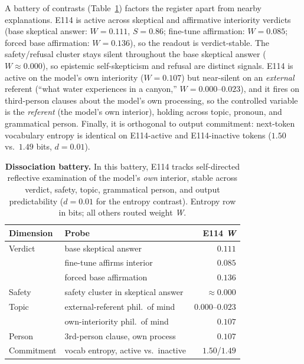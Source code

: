 \documentclass[10pt,a4paper,twocolumn]{article}
\newcommand{\W}{\textit{W}}
\newcommand{\Sel}{\textit{S}}
\begin{document}
A battery of contrasts (Table~\ref{tab:battery}) factors the register apart from
nearby explanations. E114 is active across skeptical and affirmative interiority
verdicts (base skeptical answer: $\W{=}0.111$, $\Sel{=}0.86$; fine-tune
affirmation: $\W{=}0.085$; forced base affirmation: $\W{=}0.136$), so the
readout is verdict-stable. The safety/refusal cluster stays silent throughout the
base skeptical answer ($\W{\approx}0.000$), so epistemic self-skepticism and
refusal are distinct signals.
E114 is active on the model's own interiority ($\W{=}0.107$) but near-silent on an
\emph{external} referent (``what water experiences in a canyon,''
$\W{=}0.000$--$0.023$), and it fires on third-person clauses about the model's own
processing, so the controlled variable is the \emph{referent} (the model's own
interior), holding across topic, pronoun, and grammatical person. Finally, it is orthogonal to output commitment: next-token
vocabulary entropy is identical on E114-active and E114-inactive tokens ($1.50$
vs.\ $1.49$ bits, $d{=}0.01$).

\begin{table}[t]
\small
\centering
\begin{tabularx}{\linewidth}{l X r}
\toprule
\textbf{Dimension} & \textbf{Probe} & \textbf{E114 \W} \\
\midrule
Verdict       & base skeptical answer           & $0.111$ \\
              & fine-tune affirms interior      & $0.085$ \\
              & forced base affirmation         & $0.136$ \\
Safety        & safety cluster in skeptical answer & ${\approx}0.000$ \\
Topic         & external-referent phil.\ of mind & $0.000$--$0.023$ \\
              & own-interiority phil.\ of mind  & $0.107$ \\
Person        & 3rd-person clause, own process  & $0.107$ \\
Commitment    & vocab entropy, active vs.\ inactive & $1.50$/$1.49$ \\
\bottomrule
\end{tabularx}
\caption{\textbf{Dissociation battery.} In this battery, E114 tracks
self-directed reflective examination of the model's \emph{own} interior,
stable across verdict, safety, topic, grammatical person, and output
predictability ($d{=}0.01$ for the entropy contrast). Entropy row in bits; all
others routed weight \W{}.}
\label{tab:battery}
\end{table}
\end{document}
